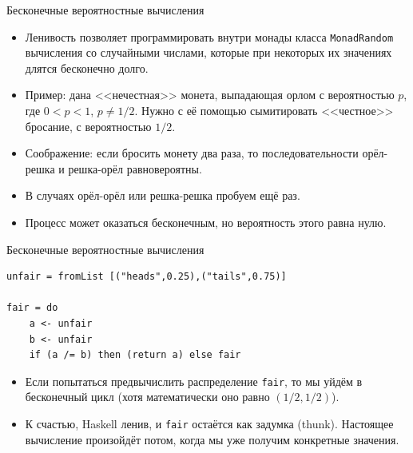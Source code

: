 \documentclass[xcolor=dvipsnames]{beamer}
\begin{document}
\begin{frame}{Бесконечные вероятностные вычисления}
 
 \begin{itemize}[<+->]
  \item Ленивость позволяет программировать внутри монады класса \texttt{MonadRandom} вычисления со случайными числами, которые при некоторых их значениях длятся бесконечно долго.
  \item Пример: дана <<нечестная>> монета, выпадающая орлом с вероятностью $p$, где $0 < p < 1$, $p \ne 1/2$. Нужно с её помощью сымитировать <<честное>> бросание, с вероятностью $1/2$.
  \item Соображение: если бросить монету два раза, то последовательности орёл-решка и решка-орёл равновероятны.
  \item В случаях орёл-орёл или решка-решка пробуем ещё раз.
  \item Процесс может оказаться бесконечным, но вероятность этого равна нулю.
 \end{itemize}

 
\end{frame}


\begin{frame}[fragile]{Бесконечные вероятностные вычисления}
 
 \begin{verbatim}
unfair = fromList [("heads",0.25),("tails",0.75)]

fair = do
    a <- unfair
    b <- unfair
    if (a /= b) then (return a) else fair
 \end{verbatim}

 \begin{itemize}
  \item<2-> Если попытаться предвычислить распределение {\tt fair}, то мы уйдём в бесконечный цикл (хотя математически оно равно $(1/2,1/2)$).
  \item<3-> К счастью, Haskell ленив, и {\tt fair} остаётся как задумка (thunk). Настоящее вычисление произойдёт потом, когда мы уже получим конкретные значения.
 \end{itemize}

 
\end{frame}
\end{document}
